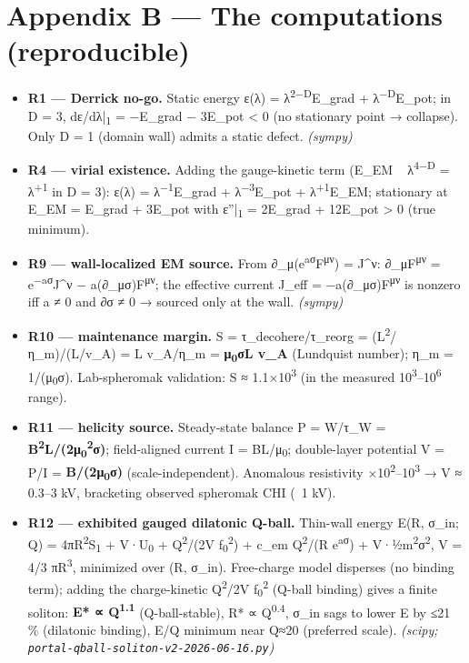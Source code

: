 \documentclass[11pt]{article}
\begin{document}
\section*{Appendix B --- The computations (reproducible)}
\begin{itemize}
\item \textbf{R1 --- Derrick no-go.} Static energy ε(λ) = λ\textsuperscript{2−D}E\_grad + λ\textsuperscript{−D}E\_pot; in D = 3, dε/dλ|\textsubscript{1} = −E\_grad − 3E\_pot < 0 (no stationary point → collapse). Only D = 1 (domain wall) admits a static defect. \emph{(sympy)}
\item \textbf{R4 --- virial existence.} Adding the gauge-kinetic term (E\_EM ~ λ\textsuperscript{4−D} = λ\textsuperscript{+1} in D = 3): ε(λ) = λ\textsuperscript{−1}E\_grad + λ\textsuperscript{−3}E\_pot + λ\textsuperscript{+1}E\_EM; stationary at E\_EM = E\_grad + 3E\_pot with ε''|\textsubscript{1} = 2E\_grad + 12E\_pot > 0 (true minimum).
\item \textbf{R9 --- wall-localized EM source.} From ∂\_μ(e\textsuperscript{aσ}F\textsuperscript{μν}) = J\textasciicircum{}ν: ∂\_μF\textsuperscript{μν} = e\textsuperscript{−aσ}J\textasciicircum{}ν − a(∂\_μσ)F\textsuperscript{μν}; the effective current J\_eff = −a(∂\_μσ)F\textsuperscript{μν} is nonzero iff a ≠ 0 and ∂σ ≠ 0 → sourced only at the wall. \emph{(sympy)}
\item \textbf{R10 --- maintenance margin.} S = τ\_decohere/τ\_reorg = (L\textsuperscript{2}/η\_m)/(L/v\_A) = L v\_A/η\_m = \textbf{μ\textsubscript{0}σL v\_A} (Lundquist number); η\_m = 1/(μ\textsubscript{0}σ). Lab-spheromak validation: S ≈ 1.1×10\textsuperscript{3} (in the measured 10\textsuperscript{3}--10\textsuperscript{6} range).
\item \textbf{R11 --- helicity source.} Steady-state balance P = W/τ\_W = \textbf{B\textsuperscript{2}L/(2μ\textsubscript{0}\textsuperscript{2}σ)}; field-aligned current I = BL/μ\textsubscript{0}; double-layer potential V = P/I = \textbf{B/(2μ\textsubscript{0}σ)} (scale-independent). Anomalous resistivity ×10\textsuperscript{2}--10\textsuperscript{3} → V ≈ 0.3--3 kV, bracketing observed spheromak CHI (~1 kV).
\item \textbf{R12 --- exhibited gauged dilatonic Q-ball.} Thin-wall energy E(R, σ\_in; Q) = 4πR\textsuperscript{2}S\textsubscript{1} + V·U\textsubscript{0} + Q\textsuperscript{2}/(2V f\textsubscript{0}\textsuperscript{2}) + c\_em Q\textsuperscript{2}/(R e\textsuperscript{aσ}) + V·½m\textsuperscript{2}σ\textsuperscript{2}, V = 4/3 πR\textsuperscript{3}, minimized over (R, σ\_in). Free-charge model disperses (no binding term); adding the charge-kinetic Q\textsuperscript{2}/2V f\textsubscript{0}\textsuperscript{2} (Q-ball binding) gives a finite soliton: \textbf{E* ∝ Q\textsuperscript{1.1}} (Q-ball-stable), R* ∝ Q\textsuperscript{0.4}, σ\_in sags to lower E by ≤21 \% (dilatonic binding), E/Q minimum near Q≈20 (preferred scale). \emph{(scipy; \texttt{portal-qball-soliton-v2-2026-06-16.py})}

\end{itemize}
\end{document}
